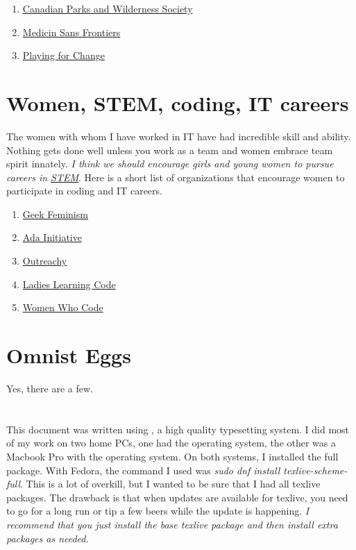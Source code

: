 \begin{enumerate}
	\item{\href{http://cpawsbc.org/}{Canadian Parks and Wilderness Society}}
	\item{\href{http://www.msf.ca/}{Medicin Sans Frontiers}}
	\item{\href{https://playingforchange.com/}{Playing for Change}}
\end{enumerate}

\section{Women, STEM, coding, IT careers}

The women with whom I have worked in IT have had incredible skill and ability. Nothing gets done well unless you work as a team and women embrace team spirit innately. \textit{I think we should encourage girls and young women to pursue careers in \href{http://www.stemeducationawareness.ca/canadian-innovation/challenging-the-barriers-between-girls-and-stem}{STEM}}. Here is a short list of organizations that encourage women to participate in coding and IT careers.

\begin{enumerate}
	\item{\href{http://geekfeminism.wikia.com/wiki/Geek_Feminism_Wiki}{Geek Feminism}}	
	\item{\href{http://adainitiative.org/}{Ada Initiative}}
	\item{\href{https://www.gnome.org/outreachy/}{Outreachy}}
	\item{\href{http://ladieslearningcode.com/girlscodeday/}{Ladies Learning Code}}
	\item{\href{https://www.womenwhocode.com/}{Women Who Code}}
\end{enumerate}

\section{Omnist Eggs}

Yes, there are a few.

\section{\latex}

This document was written using \latex, a high quality typesetting system. I did most of my work on two home PCs, one had the  operating system, the other was a Macbook Pro with the  operating system. On both systems, I installed the full \latex package. With Fedora, the command I used was \emph{sudo dnf install texlive-scheme-full}. This is a lot of overkill, but I wanted to be sure that I had all texlive packages. The drawback is that when updates are available for texlive, you need to go for a long run or tip a few beers while the update is happening. \textit{I recommend that you just install the base \emph{texlive} package and then install extra packages as needed}.

